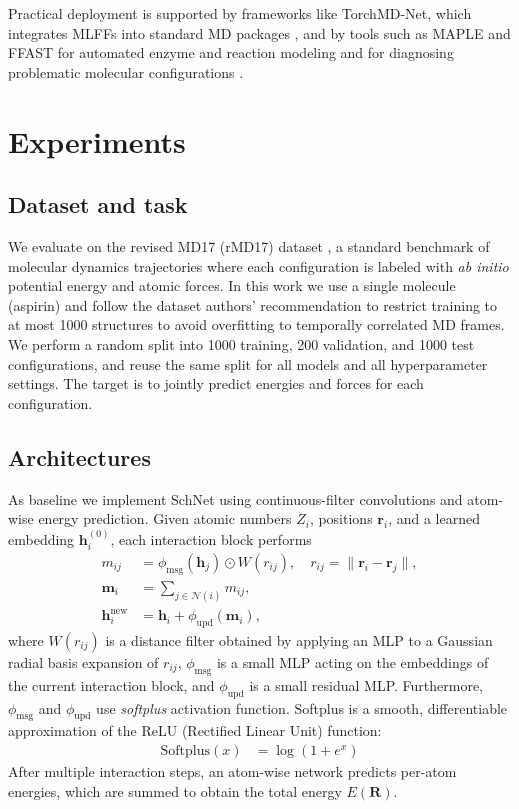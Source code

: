 \documentclass[sigconf, nonacm]{acmart}
\begin{document}
Practical deployment is supported by frameworks like TorchMD-Net, which integrates MLFFs into standard MD packages \cite{doi:10.1021/acs.jctc.4c00253}, and by tools such as MAPLE and FFAST for automated enzyme and reaction modeling and for diagnosing problematic molecular configurations \cite{D6SC01279E, doi:10.1021/acs.jctc.3c00985}.

\section{Experiments}

\subsection{Dataset and task}

We evaluate on the revised MD17 (rMD17) dataset \cite{christensen2020rmd17}, a standard benchmark of molecular dynamics trajectories where each configuration is labeled with \textit{ab initio} potential energy and atomic forces. In this work we use a single molecule (aspirin) and follow the dataset authors' recommendation to restrict training to at most 1000 structures to avoid overfitting to temporally correlated MD frames. We perform a random split into 1000 training, 200 validation, and 1000 test configurations, and reuse the same split for all models and all hyperparameter settings. The target is to jointly predict energies and forces for each configuration.

\subsection{Architectures}

As baseline we implement SchNet \cite{10.1063/1.5019779} using continuous-filter convolutions and atom-wise energy prediction. Given atomic numbers $Z_i$, positions $\mathbf{r}_i$, and a learned embedding $\mathbf{h}_i^{(0)}$, each interaction block performs
\begin{align}
	m_{ij} &= \phi_{\text{msg}}(\mathbf{h}_j)\odot W(r_{ij}), \quad
	r_{ij} = \lVert \mathbf{r}_i - \mathbf{r}_j\rVert, \\
	\mathbf{m}_i &= \sum_{j\in\mathcal{N}(i)} m_{ij}, \\
	\mathbf{h}_i^{\text{new}} &= \mathbf{h}_i + \phi_{\text{upd}}(\mathbf{m}_i),
\end{align}
where $W(r_{ij})$ is a distance filter obtained by applying an MLP to a Gaussian radial basis expansion of $r_{ij}$, $\phi_{\text{msg}}$ is a small MLP acting on the embeddings of the current interaction block, and $\phi_{\text{upd}}$ is a small residual MLP. Furthermore, $\phi_{\text{msg}}$ and $\phi_{\text{upd}}$ use \textit{softplus} activation function. Softplus is a smooth, differentiable approximation of the ReLU (Rectified Linear Unit) function:
\begin{align}
	\text{Softplus}(x) &= \log\left(1  + e^x\right)
\end{align}
After multiple interaction steps, an atom-wise network predicts per-atom energies, which are summed to obtain the total energy $E(\mathbf{R})$.
\end{document}
